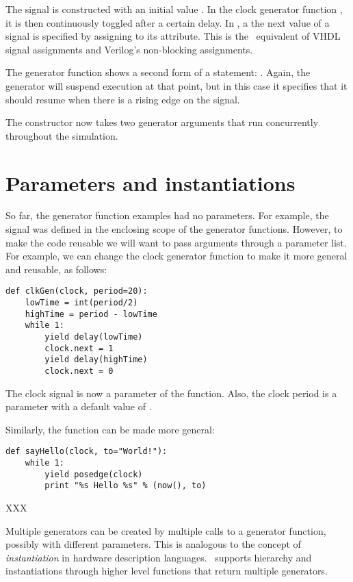 The  signal is constructed with an initial value
. In the clock generator function , it is then
continuously toggled after a certain delay. In \myhdl{}, a the next
value of a signal is specified by assigning to its 
attribute. This is the \myhdl\ equivalent of VHDL signal assignments
and Verilog's non-blocking assignments.

The  generator function shows a second form of a
 statement: . Again,
the generator will suspend execution at that point, but in this case
it specifies that it should resume when there is a rising edge on the
signal.

The  constructor now takes two generator arguments
that run concurrently throughout the simulation.

\section{Parameters and instantiations}

So far, the generator function examples had no parameters. For
example, the  signal was defined in the enclosing scope of
the generator functions. However, to make the code reusable we will
want to pass arguments through a parameter list. For example, we can
change the clock generator function to make it more general
and reusable, as follows:

\begin{verbatim}
def clkGen(clock, period=20):
    lowTime = int(period/2)
    highTime = period - lowTime
    while 1:
        yield delay(lowTime)
        clock.next = 1
        yield delay(highTime)
        clock.next = 0

\end{verbatim}

The clock signal is now a parameter of the function. Also, the clock
period is a parameter with a default value of .

Similarly, the  function can be made more general:

\begin{verbatim}
def sayHello(clock, to="World!"):
    while 1:
        yield posedge(clock)
        print "%s Hello %s" % (now(), to)

\end{verbatim}

XXX

Multiple generators can be created by multiple calls to a generator
function, possibly with different parameters. This is analogous to the
concept of \emph{instantiation} in hardware description
languages. \myhdl\ supports hierarchy and instantiations through
higher level functions that return multiple generators.

